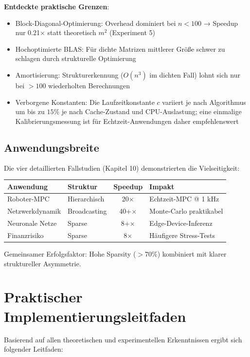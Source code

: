\documentclass[a4paper,12pt]{report}
\theoremstyle{definition}
\begin{document}
	\textbf{Entdeckte praktische Grenzen}:
	\begin{itemize}
		\item Block-Diagonal-Optimierung: Overhead dominiert bei $n < 100$ → Speedup nur 0.21$\times$ statt theoretisch $m^2$ (Experiment 5)
		\item Hochoptimierte BLAS: Für dichte Matrizen mittlerer Größe schwer zu schlagen durch strukturelle Optimierung
		\item Amortisierung: Strukturerkennung ($O(n^3)$ im dichten Fall) lohnt sich nur bei $> 100$ wiederholten Berechnungen
		\item Verborgene Konstanten: Die Laufzeitkonstante $c$ variiert je nach Algorithmus um bis zu $15\%$ je nach Cache-Zustand und CPU-Auslastung; eine einmalige Kalibrierungsmessung ist für Echtzeit-Anwendungen daher empfehlenswert
	\end{itemize}
	
	\subsection{Anwendungsbreite}
	
	Die vier detaillierten Fallstudien (Kapitel 10) demonstrierten die Vielseitigkeit:
	
	\begin{center}
		\begin{tabular}{|l|l|c|l|}
			\hline
			\textbf{Anwendung} & \textbf{Struktur} & \textbf{Speedup} & \textbf{Impakt} \\
			\hline
			Roboter-MPC & Hierarchisch & 20$\times$ & Echtzeit-MPC @ 1 kHz \\
			Netzwerkdynamik & Broadcasting & 40+$\times$ & Monte-Carlo praktikabel \\
			Neuronale Netze & Sparse & 8+$\times$ & Edge-Device-Inferenz \\
			Finanzrisiko & Sparse & 8$\times$ & Häufigere Stress-Tests \\
			\hline
		\end{tabular}
	\end{center}
	
	Gemeinsamer Erfolgsfaktor: Hohe Sparsity ($> 70\%$) kombiniert mit klarer struktureller Asymmetrie.
	
	\section{Praktischer Implementierungsleitfaden}
	
	Basierend auf allen theoretischen und experimentellen Erkenntnissen ergibt sich folgender Leitfaden:
	
\end{document}
